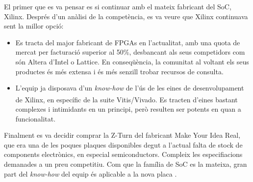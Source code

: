 {    El primer que es va pensar es si continuar amb el mateix fabricant del SoC,
    Xilinx. Després d'un anàlisi de la competència, es va veure que Xilinx
    continuava sent la millor opció: 
    
    \begin{itemize}
        \item
            Es tracta del major fabricant de FPGAs en l'actualitat, amb una
            quota de mercat per facturació superior al 50\%, desbancant als
            seus competidors com són Altera d'Intel o Lattice. En conseqüència,
            la comunitat al voltant els seus productes és més extensa i és més
            senzill trobar recursos de consulta.
        \item 
            L'equip ja disposava d'un \emph{know-how} de l'ús de les eines de
            desenvolupament de Xilinx, en específic de la suite
            Vitis/Vivado\textsuperscript{\textregistered}. Es tracten d'eines
            bastant complexes i intimidants en un principi, però resulten ser
            potents en quan a funcionalitat.
    \end{itemize}

    Finalment es va decidir comprar la Z-Turn del fabricant Make Your Idea
    Real, que era una de les poques plaques disponibles degut a l'actual falta
    de stock de components electrònics, en especial semiconductors. Compleix
    les especifiacions demanades a un preu competitiu. Com que la família de
    SoC es la mateixa, gran part del \emph{know-how} del equip és aplicable a
    la nova placa \cite{zturn}.

}

